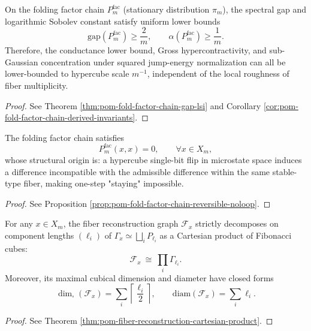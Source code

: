 \begin{conclusion}\label{con:xi-terminal-factor-chain-gap-lsi-hypercontractive}
On the folding factor chain \(P^{\mathrm{fac}}_m\) (stationary distribution \(\pi_m\)), the spectral gap and logarithmic Sobolev constant satisfy uniform lower bounds
\[
\mathrm{gap}(P^{\mathrm{fac}}_m)\ge \frac{2}{m},
\qquad
\alpha(P^{\mathrm{fac}}_m)\ge \frac{1}{m}.
\]
Therefore, the conductance lower bound, Gross hypercontractivity, and sub-Gaussian concentration under squared jump-energy normalization can all be lower-bounded to hypercube scale \(m^{-1}\), independent of the local roughness of fiber multiplicity.
\end{conclusion}
\begin{proof}[Proof]
See Theorem \ref{thm:pom-fold-factor-chain-gap-lsi} and Corollary \ref{cor:pom-fold-factor-chain-derived-invariants}.
\end{proof}

\begin{conclusion}\label{con:xi-terminal-factor-chain-no-self-loop}
The folding factor chain satisfies
\[
P^{\mathrm{fac}}_m(x,x)=0,\qquad \forall x\in X_m,
\]
whose structural origin is: a hypercube single-bit flip in microstate space induces a difference incompatible with the admissible difference within the same stable-type fiber, making one-step "staying" impossible.
\end{conclusion}
\begin{proof}[Proof]
See Proposition \ref{prop:pom-fold-factor-chain-reversible-noloop}.
\end{proof}

\begin{conclusion}\label{con:xi-terminal-fiber-reconstruction-cartesian}
For any \(x\in X_m\), the fiber reconstruction graph \(\mathcal F_x\) strictly decomposes on component lengths \((\ell_i)\) of \(\Gamma_x\simeq\bigsqcup_i P_{\ell_i}\) as a Cartesian product of Fibonacci cubes:
\[
\mathcal F_x\ \cong\ \prod_i \Gamma_{\ell_i}.
\]
Moreover, its maximal cubical dimension and diameter have closed forms
\[
\dim_{\square}(\mathcal F_x)=\sum_i \left\lceil\frac{\ell_i}{2}\right\rceil,
\qquad
\mathrm{diam}(\mathcal F_x)=\sum_i \ell_i .
\]
\end{conclusion}
\begin{proof}[Proof]
See Theorem \ref{thm:pom-fiber-reconstruction-cartesian-product}.
\end{proof}

